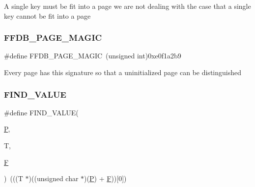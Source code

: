 A single key must be fit into a page we are not dealing with the case that a single key cannot be fit into a page \mbox{\label{adat-devel_2other__libs_2filedb_2filehash_2ffdb__page_8h_aaa31a771ae4402ac60ba020cd7f9bc46}} 
\subsubsection{\texorpdfstring{FFDB\_PAGE\_MAGIC}{FFDB\_PAGE\_MAGIC}}
{\footnotesize\ttfamily \#define F\+F\+D\+B\+\_\+\+P\+A\+G\+E\+\_\+\+M\+A\+G\+IC~(unsigned int)0xe0f1a2b9}

Every page has this signature so that a uninitialized page can be distinguished \mbox{\label{adat-devel_2other__libs_2filedb_2filehash_2ffdb__page_8h_aac067124fe4d81f5306f4e2131e1121e}} 
\subsubsection{\texorpdfstring{FIND\_VALUE}{FIND\_VALUE}}
{\footnotesize\ttfamily \#define F\+I\+N\+D\+\_\+\+V\+A\+L\+UE(\begin{DoxyParamCaption}\item[{}]{\mbox{\hyperlink{adat__devel_2lib_2hadron_2operator__name__util_8cc_aef94be98e2c9e4a4dece75f60ca9792c}{P}},  }\item[{}]{T,  }\item[{}]{\mbox{\hyperlink{adat__devel_2lib_2hadron_2operator__name__util_8cc_a021548fea4fc01ff0117c90090d7adfc}{F}} }\end{DoxyParamCaption})~(((T $\ast$)((unsigned char $\ast$)(\mbox{\hyperlink{adat__devel_2lib_2hadron_2operator__name__util_8cc_aef94be98e2c9e4a4dece75f60ca9792c}{P}}) + \mbox{\hyperlink{adat__devel_2lib_2hadron_2operator__name__util_8cc_a021548fea4fc01ff0117c90090d7adfc}{F}}))\mbox{[}0\mbox{]})}

\mbox{\label{adat-devel_2other__libs_2filedb_2filehash_2ffdb__page_8h_adad1dfd923f34ba368bdc27c8040be12}} 
